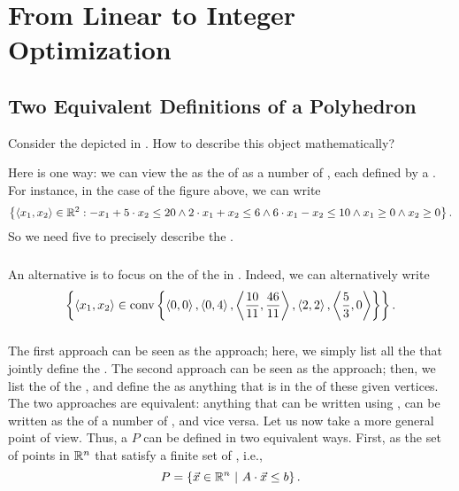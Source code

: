 \chapter{From Linear to Integer Optimization}

\section{Two Equivalent Definitions of a Polyhedron}

Consider the  depicted in . How to describe this object mathematically?


Here is one way: we can view the  as the  of as a number of , each  defined by a . For instance, in the case of the figure above, we can write
\begin{equation}
\left\{ \left\langle x_1,x_2 \right\rangle\in\mathbb{R}^2: -x_1+5\cdot x_2\leq 20 \wedge 2\cdot x_1+x_2\leq 6\wedge 6\cdot x_1-x_2\leq 10\wedge x_1\geq 0\wedge x_2\geq 0 \right\}.
\end{equation}
So we need five  to precisely describe the .

\paragraph{}
An alternative is to focus on the  of the  in . Indeed, we can alternatively write
\begin{equation}
\left\{ \left\langle x_1,x_2 \right\rangle\in\mbox{conv}\left\{ \left\langle 0,0 \right\rangle,\left\langle 0,4 \right\rangle,\left\langle \frac{10}{11},\frac{46}{11} \right\rangle,\left\langle 2,2 \right\rangle,\left\langle \frac{5}{3},0 \right\rangle \right\} \right\}.
\end{equation}

\paragraph{}
The first approach can be seen as the  approach; here, we simply list all the  that jointly define the . The second approach can be seen as the  approach; then, we list the  of the , and define the  as anything that is in the  of these given vertices. The two approaches are equivalent: anything that can be written using , can be written as the  of a number of , and vice versa. Let us now take a more general point of view. Thus, a  $P$ can be defined in two equivalent ways. First, as the set of points in $\mathbb{R}^n$ that satisfy a finite set of , i.e.,
\begin{equation}
P=\left\{ \vec{x}\in\mathbb{R}^n\ |\ A\cdot\vec{x}\leq b \right\}.
\end{equation}

